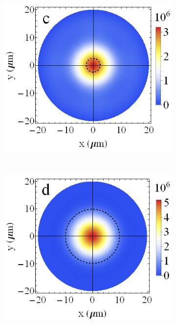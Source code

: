 \documentclass[aps,pra,amsmath,amssymb,onecolumn,superscriptaddress,showpacs,floatfix,]{revtex4-1}
\begin{document}
\begin{figure}[h]
\begin{subfigure}[h]{0.32\linewidth}
		\includegraphics[width=\linewidth]{Fig3c.png}
	\end{subfigure}
	\\
	\begin{subfigure}[h]{0.32\linewidth}
		\includegraphics[width=\linewidth]{Fig3d.png}
	\end{subfigure}
	\begin{subfigure}[h]{0.32\linewidth}

\end{subfigure}
\end{figure}
\end{document}
